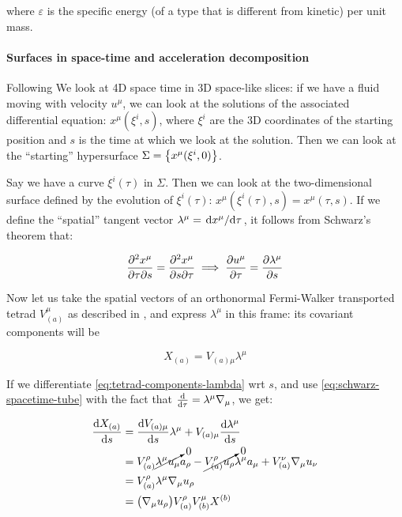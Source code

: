 \documentclass[main.tex]{subfiles}
\begin{document}
where $\varepsilon$ is the specific energy (of a type that is different from kinetic) per unit mass.

\paragraph{Surfaces in space-time and acceleration decomposition}

Following \cite[section 4]{Taub:1978}
We look at 4D space time in 3D space-like slices: if we have a fluid moving with velocity \(u^\mu\), we can look at the solutions of the associated differential equation: \(x^\mu (\xi^i, s)\), where \(\xi^i\) are the 3D coordinates of the starting position and \(s\) is the time at which we look at the solution. Then we can look at the ``starting'' hypersurface \(\Sigma = \qty{x^\mu (\xi^i, 0)}\).

Say we have a curve \(\xi^i(\tau)\) in \(\Sigma\). Then we can look at the two-dimensional surface defined by the evolution of \(\xi^i(\tau)\): \(x^{\mu} (\xi^i(\tau), s) = x^\mu (\tau, s)\). If we define the ``spatial'' tangent vector \(\lambda^\mu = \dv*{x^\mu}{\tau} \), it follows from Schwarz's theorem that:

\begin{equation} \label{eq:schwarz-spacetime-tube}
    \pdv{x^\mu}{\tau}{s} =
    \pdv{x^\mu}{s}{\tau}
    \implies
    \pdv{u^\mu}{\tau} = \pdv{\lambda^\mu}{s}
\end{equation}

Now let us take the spatial vectors of an orthonormal Fermi-Walker transported tetrad \(V^\mu_{(a)}\) as described in , and express \(\lambda^\mu\) in this frame: its covariant components will be

\begin{equation} \label{eq:tetrad-components-lambda}
    X_{(a)} = V_{(a)\mu} \lambda^\mu
\end{equation}

If we differentiate \eqref{eq:tetrad-components-lambda} wrt \(s\), and use \eqref{eq:schwarz-spacetime-tube} with the fact that \(\dv{}{\tau} = \lambda^\mu \nabla_\mu \), we get:

\begin{subequations}
\begin{align}
    \dv{X_{(a)}}{s} &= \dv{V_{(a)\mu}}{s} \lambda^\mu + V_{(a)\mu} \dv{\lambda^\mu}{s}  \\
    &= V_{(a)}^\rho \cancelto{0}{\lambda^\mu u_\mu} a_\rho - \cancelto{0}{V_{(a)}^\rho  u_\rho} \lambda^\mu a_\mu
    + V_{(a)}^\nu \nabla_\mu u_\nu  \\
    &= V^\rho _{(a)} \lambda^\mu \nabla_\mu u_\rho  \\
    &= \qty(\nabla_\mu u_\rho) V^\rho_{(a)} V^{\mu}_{(b)} X^{(b)}
\end{align}
\end{subequations}
\end{document}
